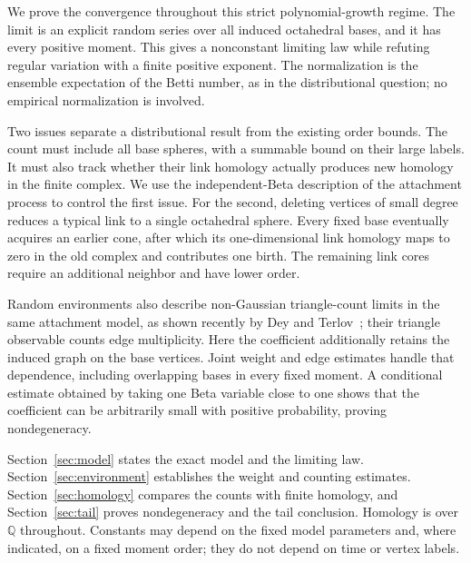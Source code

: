 \documentclass[11pt]{article}
\theoremstyle{remark}\newtheorem{remark}[theorem]{Remark}
\newcommand{\Q}{\mathbb Q}
\begin{document}
We prove the convergence throughout this strict polynomial-growth regime.
The limit is an explicit random series over all induced octahedral bases,
and it has every positive moment. This gives a nonconstant limiting law while
refuting regular variation with a finite positive exponent. The normalization
is the ensemble expectation of the Betti number, as in the distributional
question; no empirical normalization is involved.

Two issues separate a distributional result from the existing order bounds.
The count must include all base spheres, with a summable bound on their large
labels. It must also track whether their link homology actually produces
new homology in the finite complex. We use the independent-Beta description
of the attachment process to control the first issue. For the second,
deleting vertices of small degree reduces a typical link to a single
octahedral sphere. Every fixed base eventually acquires an earlier cone,
after which its one-dimensional link homology maps to zero in the old complex
and contributes one birth. The remaining link cores require an additional
neighbor and have lower order.

Random environments also describe non-Gaussian triangle-count limits in the
same attachment model, as shown recently by Dey and Terlov~\cite{dey-terlov};
their triangle observable counts edge multiplicity.
Here the coefficient additionally retains the induced graph on the base
vertices. Joint weight and edge estimates handle that dependence, including
overlapping bases in every fixed moment. A conditional estimate obtained by
taking one Beta variable close to one shows that the coefficient can be
arbitrarily small with positive probability, proving nondegeneracy.

Section~\ref{sec:model} states the exact model and the limiting law.
Section~\ref{sec:environment} establishes the weight and counting estimates.
Section~\ref{sec:homology} compares the counts with finite homology, and
Section~\ref{sec:tail} proves nondegeneracy and the tail conclusion.
Homology is over $\Q$ throughout. Constants may depend on the fixed model
parameters and, where indicated, on a fixed moment order; they do not depend
on time or vertex labels.
\end{document}
